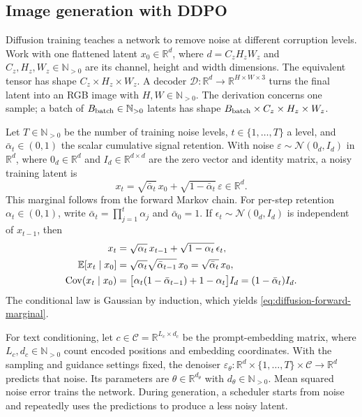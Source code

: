 \subsection{Image generation with DDPO}
\label{app:diffusion}
Diffusion training teaches a network to remove noise at different corruption levels. Work with one flattened latent $x_0\in\mathbb R^d$, where $d=C_zH_zW_z$ and $C_z,H_z,W_z\in\mathbb N_{>0}$ are its channel, height and width dimensions. The equivalent tensor has shape $C_z\times H_z\times W_z$. A decoder $\mathcal D:\mathbb R^d\to\mathbb R^{H\times W\times3}$ turns the final latent into an RGB image with $H,W\in\mathbb N_{>0}$. The derivation concerns one sample; a batch of $B_{\rm batch}\in\mathbb N_{>0}$ latents has shape $B_{\rm batch}\times C_z\times H_z\times W_z$.

Let $T\in\mathbb N_{>0}$ be the number of training noise levels, $t\in\{1,\ldots,T\}$ a level, and $\bar\alpha_t\in(0,1)$ the scalar cumulative signal retention. With noise $\varepsilon\sim\mathcal N(0_d,I_d)$ in $\mathbb R^d$, where $0_d\in\mathbb R^d$ and $I_d\in\mathbb R^{d\times d}$ are the zero vector and identity matrix, a noisy training latent is
\begin{equation}
\label{eq:diffusion-forward-marginal}
 x_t=\sqrt{\bar\alpha_t}\,x_0+\sqrt{1-\bar\alpha_t}\,\varepsilon\in\mathbb R^d.
\end{equation}
This marginal follows from the forward Markov chain. For per-step retention $\alpha_t\in(0,1)$, write $\bar\alpha_t=\prod_{j=1}^t\alpha_j$ and $\bar\alpha_0=1$. If $\epsilon_t\sim\mathcal N(0_d,I_d)$ is independent of $x_{t-1}$, then
\begin{align}
 x_t &= \sqrt{\alpha_t}\,x_{t-1}+\sqrt{1-\alpha_t}\,\epsilon_t,
      \label{eq:diffusion-forward-step}\\
 \mathbb{E}[x_t\mid x_0]
     &=\sqrt{\alpha_t}\sqrt{\bar\alpha_{t-1}}\,x_0
       =\sqrt{\bar\alpha_t}\,x_0,\label{eq:diffusion-forward-mean}\\
 \operatorname{Cov}(x_t\mid x_0)
     &=\big[\alpha_t(1-\bar\alpha_{t-1})+1-\alpha_t\big]I_d
       =(1-\bar\alpha_t)I_d.\label{eq:diffusion-forward-covariance}
\end{align}
The conditional law is Gaussian by induction, which yields \eqref{eq:diffusion-forward-marginal}.

For text conditioning, let $c\in\mathcal C=\mathbb R^{L_c\times d_c}$ be the prompt-embedding matrix, where $L_c,d_c\in\mathbb N_{>0}$ count encoded positions and embedding coordinates. With the sampling and guidance settings fixed, the denoiser $\varepsilon_\theta:\mathbb R^d\times\{1,\ldots,T\}\times\mathcal C\to\mathbb R^d$ predicts that noise. Its parameters are $\theta\in\mathbb R^{d_\theta}$ with $d_\theta\in\mathbb N_{>0}$. Mean squared noise error trains the network. During generation, a scheduler starts from noise and repeatedly uses the predictions to produce a less noisy latent.

